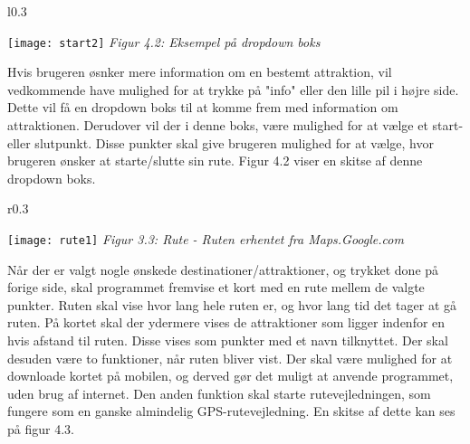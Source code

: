 \begin{wrapfigure}{l}{0.3\textwidth}
	\vspace{-40pt}
	\begin{center}
		\texttt{[image: start2]} \newline
		\textit{Figur 4.2: \newline Eksempel på dropdown boks}\newline
	\end{center}
	\vspace{20pt}
\end{wrapfigure}

Hvis brugeren øsnker mere information om en bestemt attraktion, vil vedkommende have mulighed for at trykke på "info" eller den lille pil i højre side. Dette vil få en dropdown boks til at komme frem med information om attraktionen. Derudover vil der i denne boks, være mulighed for at vælge et start- eller slutpunkt. Disse punkter skal give brugeren mulighed for at vælge, hvor brugeren ønsker at starte/slutte sin rute. Figur 4.2 viser en skitse af denne dropdown boks.\newline
\newline
\newline
\newline
\newline

\begin{wrapfigure}{r}{0.3\textwidth}
	\vspace{-30pt}
	\begin{center}
		\texttt{[image: rute1]} \newline
		\textit{Figur 3.3: Rute - Ruten er\newline hentet fra Maps.Google.com}\newline
	\end{center}
	\vspace{0pt}
	\vspace{-100pt}
\end{wrapfigure}


Når der er valgt nogle ønskede destinationer/attraktioner, og trykket done på forige side, skal programmet fremvise et kort med en rute mellem de valgte punkter. Ruten skal vise hvor lang hele ruten er, og hvor lang tid det tager at gå ruten. På kortet skal der ydermere vises de attraktioner som ligger indenfor en hvis afstand til ruten. Disse vises som punkter med et navn tilknyttet.
Der skal desuden være to funktioner, når ruten bliver vist. Der skal være mulighed for at downloade kortet på mobilen, og derved gør det muligt at anvende programmet, uden brug af internet. Den anden funktion skal starte rutevejledningen, som fungere som en ganske almindelig GPS-rutevejledning. En skitse af dette kan ses på figur 4.3.\newline
\newline
\newline
\newline

